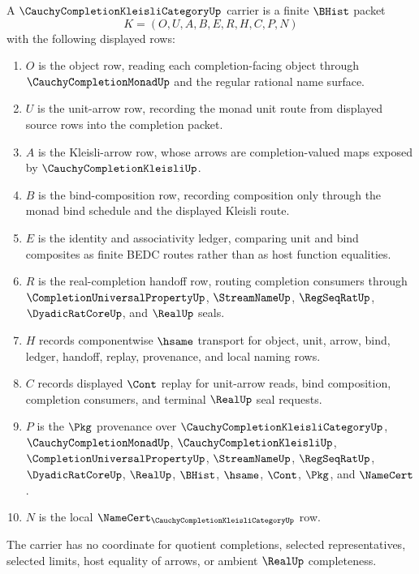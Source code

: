 \begin{definition}
\label{def:cauchy-completion-kleisli-category-carrier}
A $\CauchyCompletionKleisliCategoryUp$ carrier is a finite $\BHist$ packet
$$
K=(O,U,A,B,E,R,H,C,P,N)
$$
with the following displayed rows:
\begin{enumerate}
\item $O$ is the object row, reading each completion-facing object through $\CauchyCompletionMonadUp$ and the regular rational name surface.
\item $U$ is the unit-arrow row, recording the monad unit route from displayed source rows into the completion packet.
\item $A$ is the Kleisli-arrow row, whose arrows are completion-valued maps exposed by $\CauchyCompletionKleisliUp$.
\item $B$ is the bind-composition row, recording composition only through the monad bind schedule and the displayed Kleisli route.
\item $E$ is the identity and associativity ledger, comparing unit and bind composites as finite BEDC routes rather than as host function equalities.
\item $R$ is the real-completion handoff row, routing completion consumers through $\CompletionUniversalPropertyUp$, $\StreamNameUp$, $\RegSeqRatUp$, $\DyadicRatCoreUp$, and $\RealUp$ seals.
\item $H$ records componentwise $\hsame$ transport for object, unit, arrow, bind, ledger, handoff, replay, provenance, and local naming rows.
\item $C$ records displayed $\Cont$ replay for unit-arrow reads, bind composition, completion consumers, and terminal $\RealUp$ seal requests.
\item $P$ is the $\Pkg$ provenance over $\CauchyCompletionKleisliCategoryUp$, $\CauchyCompletionMonadUp$, $\CauchyCompletionKleisliUp$, $\CompletionUniversalPropertyUp$, $\StreamNameUp$, $\RegSeqRatUp$, $\DyadicRatCoreUp$, $\RealUp$, $\BHist$, $\hsame$, $\Cont$, $\Pkg$, and $\NameCert$.
\item $N$ is the local $\NameCert_{\CauchyCompletionKleisliCategoryUp}$ row.
\end{enumerate}
The carrier has no coordinate for quotient completions, selected representatives, selected limits, host equality of arrows, or ambient $\RealUp$ completeness.
\end{definition}

